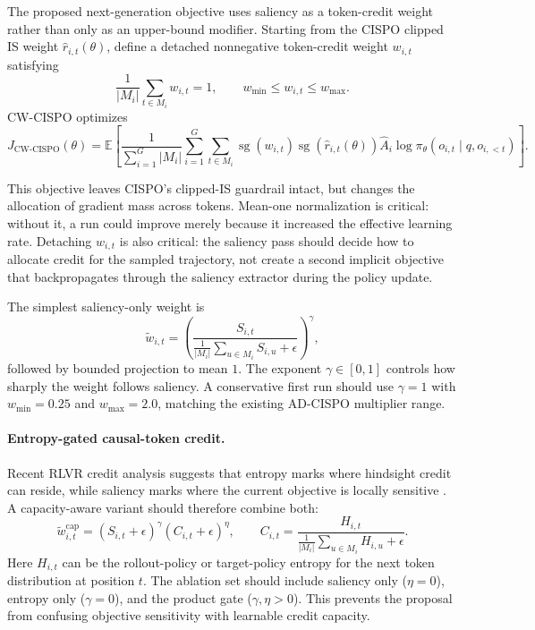 \documentclass[11pt]{article}
\begin{document}
The proposed next-generation objective uses saliency as a token-credit weight
rather than only as an upper-bound modifier. Starting from the CISPO clipped IS
weight $\hat{r}_{i,t}(\theta)$, define a detached nonnegative token-credit
weight $w_{i,t}$ satisfying
\begin{equation}
  \frac{1}{|M_i|}\sum_{t \in M_i} w_{i,t} = 1,
  \qquad
  w_{\min} \leq w_{i,t} \leq w_{\max}.
\end{equation}
CW-CISPO optimizes
\begin{equation}
  J_{\mathrm{CW\mbox{-}CISPO}}(\theta)
  =
  \mathbb{E}
  \left[
    \frac{1}{\sum_{i=1}^G |M_i|}
    \sum_{i=1}^G \sum_{t \in M_i}
    \operatorname{sg}\!\left(w_{i,t}\right)
    \operatorname{sg}\!\left(\hat{r}_{i,t}(\theta)\right)
    \hat{A}_i
    \log \pi_\theta(o_{i,t}\mid q,o_{i,<t})
  \right].
\end{equation}

This objective leaves CISPO's clipped-IS guardrail intact, but changes the
allocation of gradient mass across tokens. Mean-one normalization is critical:
without it, a run could improve merely because it increased the effective
learning rate. Detaching $w_{i,t}$ is also critical: the saliency pass should
decide how to allocate credit for the sampled trajectory, not create a second
implicit objective that backpropagates through the saliency extractor during
the policy update.

The simplest saliency-only weight is
\begin{equation}
  \tilde{w}_{i,t}
  =
  \left(
    \frac{S_{i,t}}
    {\frac{1}{|M_i|}\sum_{u \in M_i} S_{i,u} + \epsilon}
  \right)^\gamma,
\end{equation}
followed by bounded projection to mean $1$. The exponent $\gamma \in [0,1]$
controls how sharply the weight follows saliency. A conservative first run
should use $\gamma=1$ with $w_{\min}=0.25$ and $w_{\max}=2.0$, matching the
existing AD-CISPO multiplier range.

\paragraph{Entropy-gated causal-token credit.}
Recent RLVR credit analysis suggests that entropy marks where hindsight credit
can reside, while saliency marks where the current objective is locally
sensitive \cite{he2026hindsightcredit}. A capacity-aware variant should
therefore combine both:
\begin{equation}
  \tilde{w}^{\mathrm{cap}}_{i,t}
  =
  \left(S_{i,t}+\epsilon\right)^\gamma
  \left(C_{i,t}+\epsilon\right)^\eta,
  \qquad
  C_{i,t}
  =
  \frac{H_{i,t}}
  {\frac{1}{|M_i|}\sum_{u \in M_i} H_{i,u}+\epsilon}.
\end{equation}
Here $H_{i,t}$ can be the rollout-policy or target-policy entropy for the next
token distribution at position $t$. The ablation set should include saliency
only ($\eta=0$), entropy only ($\gamma=0$), and the product gate
($\gamma,\eta>0$). This prevents the proposal from confusing objective
sensitivity with learnable credit capacity.
\end{document}
